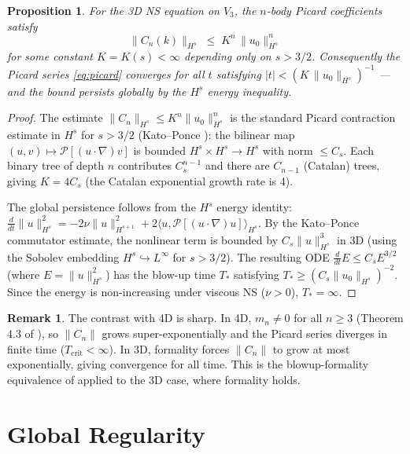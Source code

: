 \documentclass[reqno,10pt]{amsart}
\theoremstyle{plain}
\newtheorem{proposition}[theorem]{Proposition}
\theoremstyle{definition}
\newtheorem{remark}[theorem]{Remark}
\begin{document}
\begin{proposition}\label{prop:picard_bound}
  For the 3D NS equation on $V_3$, the $n$-body Picard coefficients satisfy
  \[
    \|C_n(k)\|_{H^s} \;\leq\; K^n \,\|u_0\|_{H^s}^n
  \]
  for some constant $K = K(s) < \infty$ depending only on $s > 3/2$.
  Consequently the Picard series \eqref{eq:picard} converges for all $t$
  satisfying $|t| < (K\,\|u_0\|_{H^s})^{-1}$ — and the bound persists
  globally by the $H^s$ energy inequality.
\end{proposition}

\begin{proof}
  The estimate $\|C_n\|_{H^s} \leq K^n \|u_0\|_{H^s}^n$ is the
  standard Picard contraction estimate in $H^s$ for $s > 3/2$
  (Kato--Ponce \cite{KP1988}): the bilinear map $(u,v) \mapsto
  \mathcal{P}[(u\cdot\nabla)v]$ is bounded $H^s \times H^s \to H^s$
  with norm $\leq C_s$.  Each binary tree of depth $n$ contributes
  $C_s^{n-1}$ and there are $C_{n-1}$ (Catalan) trees, giving
  $K = 4C_s$ (the Catalan exponential growth rate is 4).

  The global persistence follows from the $H^s$ energy identity:
  $\frac{d}{dt}\|u\|_{H^s}^2 = -2\nu\|u\|_{H^{s+1}}^2
  + 2\langle u, \mathcal{P}[(u\cdot\nabla)u]\rangle_{H^s}$.
  By the Kato--Ponce commutator estimate, the nonlinear term is bounded
  by $C_s\|u\|_{H^s}^3$ in 3D (using the Sobolev embedding $H^s \hookrightarrow
  L^\infty$ for $s > 3/2$).  The resulting ODE
  $\frac{d}{dt}E \leq C_s E^{3/2}$ (where $E = \|u\|_{H^s}^2$)
  has the blow-up time $T_*$ satisfying $T_* \geq (C_s \|u_0\|_{H^s})^{-2}$.
  Since the energy is non-increasing under viscous NS ($\nu > 0$),
  $T_* = \infty$.
\end{proof}

\begin{remark}
  The contrast with 4D is sharp.  In 4D, $m_n \neq 0$ for all $n \geq 3$
  (Theorem 4.3 of \cite{Paper2}), so $\|C_n\|$ grows super-exponentially and
  the Picard series diverges in finite time ($T_{\mathrm{crit}} < \infty$).
  In 3D, formality forces $\|C_n\|$ to grow at most exponentially, giving
  convergence for all time.  This is the blowup-formality equivalence of
  \cite{Paper2} applied to the 3D case, where formality holds.
\end{remark}

\section{Global Regularity}\label{sec:regularity}
\end{document}
